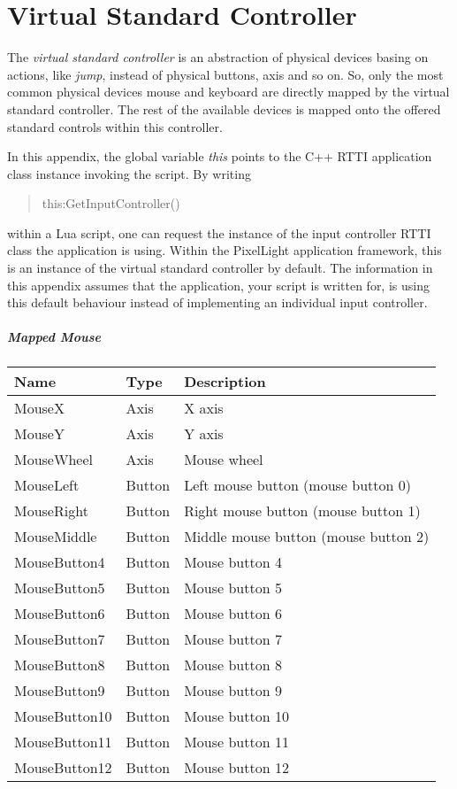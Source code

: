 \chapter{Virtual Standard Controller}
\label{Appendix:VirtualStandardController}
The \emph{virtual standard controller} is an abstraction of physical devices basing on actions, like \emph{jump}, instead of physical buttons, axis and so on. So, only the most common physical devices mouse and keyboard are directly mapped by the virtual standard controller. The rest of the available devices is mapped onto the offered standard controls within this controller.

In this appendix, the global variable \emph{this} points to the C++ \ac{RTTI} application class instance invoking the script. By writing \begin{quote}this:GetInputController()\end{quote} within a Lua script, one can request the instance of the input controller \ac{RTTI} class the application is using. Within the PixelLight application framework, this is an instance of the virtual standard controller by default. The information in this appendix assumes that the application, your script is written for, is using this default behaviour instead of implementing an individual input controller.


\paragraph{Mapped Mouse}
\begin{center}
	\centering
	\begin{longtable}{ | l | l | p{9cm} |}
	\hline
	Name			&	Type	&	Description\\ \hline
	MouseX			&	Axis	&	X axis\\
	MouseY			&	Axis	&	Y axis\\
	MouseWheel		&	Axis	&	Mouse wheel\\
	MouseLeft		&	Button	&	Left mouse button (mouse button 0)\\
	MouseRight		&	Button	&	Right mouse button (mouse button 1)\\
	MouseMiddle		&	Button	&	Middle mouse button (mouse button 2)\\
	MouseButton4	&	Button	&	Mouse button 4\\
	MouseButton5	&	Button	&	Mouse button 5\\
	MouseButton6	&	Button	&	Mouse button 6\\
	MouseButton7	&	Button	&	Mouse button 7\\
	MouseButton8	&	Button	&	Mouse button 8\\
	MouseButton9	&	Button	&	Mouse button 9\\
	MouseButton10	&	Button	&	Mouse button 10\\
	MouseButton11	&	Button	&	Mouse button 11\\
	MouseButton12	&	Button	&	Mouse button 12\\
	\hline
	\end{longtable}
\end{center}


